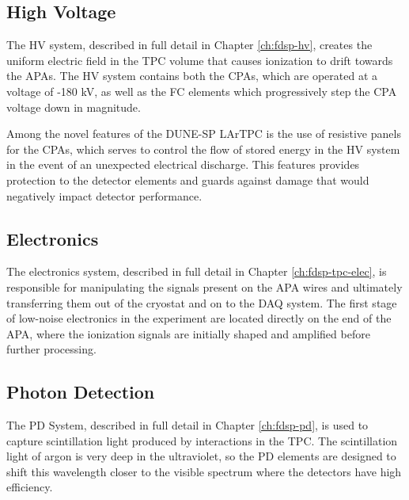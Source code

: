 \subsection{High Voltage}
\label{sec:fdsp-ov-hv}

The HV system, described in full detail in Chapter \ref{ch:fdsp-hv}, creates the uniform electric field in the TPC volume that causes ionization to drift towards the APAs.  The HV system contains both the CPAs, which are operated at a voltage of -180 kV, as well as the FC elements which progressively step the CPA voltage down in magnitude.  

Among the novel features of the DUNE-SP LArTPC is the use of resistive panels for the CPAs, which serves to control the flow of stored energy in the HV system in the event of an unexpected electrical discharge.  This features provides protection to the detector elements and guards against damage that would negatively impact detector performance.  



\subsection{Electronics}
\label{sec:fdsp-ov-elec}

The electronics system, described in full detail in Chapter \ref{ch:fdsp-tpc-elec}, is responsible for manipulating the signals present on the APA wires and ultimately transferring them out of the cryostat and on to the DAQ system.  The first stage of low-noise electronics in the experiment are located directly on the end of the APA, where the ionization signals are initially shaped and amplified before further processing. 


\subsection{Photon Detection}
\label{sec:fdsp-ov-pds}

The PD System, described in full detail in Chapter \ref{ch:fdsp-pd}, is used to capture scintillation light produced by interactions in the TPC.  The scintillation light of argon is very deep in the ultraviolet, so the PD elements are designed to shift this wavelength closer to the visible spectrum where the detectors have high efficiency.  

